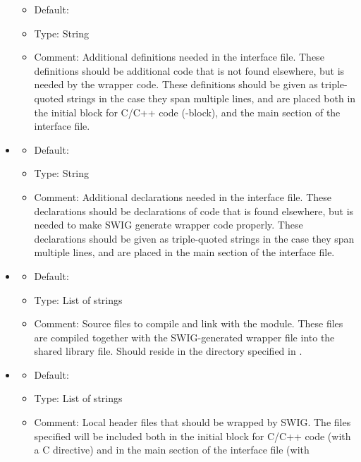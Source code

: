 \begin{itemize}
  \begin{itemize}
    \item Default: 
    \item Type: String
    \item Comment: Additional definitions needed in the interface file.
      These definitions should be additional code that is not found
      elsewhere, but is needed by the wrapper code.
      These definitions should be given as triple-quoted
      strings in the case they span multiple lines, and are placed both in the
      initial block for C/C++ code (\emp{\%\{,\%\}}-block), and the main section
      of the interface file.
  \end{itemize}
\item {}
  \begin{itemize}
    \item Default: 
    \item Type: String
    \item Comment: Additional declarations needed in the interface file.
      These declarations should be declarations of code that is found
      elsewhere, but is needed to make SWIG generate wrapper code properly.
      These declarations should be given as triple-quoted
      strings in the case they span multiple lines, and are placed in the main
      section of the interface file.
  \end{itemize}
\item {}
  \begin{itemize}
    \item Default: \emp{[]}
    \item Type: List of strings
    \item Comment: Source files to compile and link with the module. These
      files are compiled together with the SWIG-generated wrapper file into
      the shared library file. Should reside in the directory specified in
      .
  \end{itemize}
\item {}
  \begin{itemize}
    \item Default: \emp{[]}
    \item Type: List of strings
    \item Comment: Local header files that should be wrapped by SWIG. The
      files specified will be included both in the initial block for C/C++ code
      (with a C directive) and in the main section of the interface file (with

\end{itemize}
\end{itemize}
